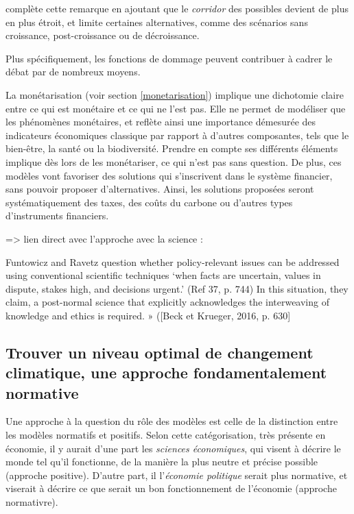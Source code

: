 \cite{cointe_ar6_2024} complète cette remarque en ajoutant que le \emph{corridor} des possibles devient de plus en plus étroit, et limite certaines alternatives, comme des scénarios sans croissance, post-croissance ou de décroissance. 

Plus spécifiquement, les fonctions de dommage peuvent contribuer à cadrer le débat par de nombreux moyens. 

La monétarisation (voir section \ref{monetarisation}) implique une dichotomie claire entre ce qui est monétaire et ce qui ne l'est pas. Elle ne permet de modéliser que les phénomènes monétaires, et reflète ainsi une importance démesurée des indicateurs économiques classique par rapport à d'autres composantes, tels que le bien-être, la santé ou la biodiversité. Prendre en compte ses différents éléments implique dès lors de les monétariser, ce qui n'est pas sans question. 
De plus, ces modèles vont favoriser des solutions qui s'inscrivent dans le système financier, sans pouvoir proposer d'alternatives. Ainsi, les solutions proposées seront systématiquement des taxes, des coûts du carbone ou d'autres types d'instruments financiers.


=> lien direct avec l'approche avec la science : 

\begin{displayquote}
    Funtowicz and Ravetz question whether policy-relevant issues can be addressed using conventional scientific techniques ‘when facts are uncertain, values in dispute, stakes high, and decisions urgent.’ (Ref 37, p. 744) In this situation, they claim, a post-normal science that explicitly acknowledges the interweaving of knowledge and ethics is required. » ([Beck et Krueger, 2016, p. 630]
\end{displayquote}


\subsection{Trouver un niveau optimal de changement climatique, une approche fondamentalement normative}

Une approche à la question du rôle des modèles est celle de la distinction entre les modèles normatifs et positifs. Selon cette catégorisation, très présente en économie, il y aurait d'une part les \emph{sciences économiques}, qui visent à décrire le monde tel qu'il fonctionne, de la manière la plus neutre et précise possible (approche positive). D'autre part, il l'\emph{économie politique} serait plus normative, et viserait à décrire ce que serait un bon fonctionnement de l'économie (approche normativre). 

